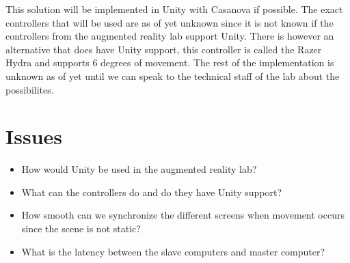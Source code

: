 \documentclass[10pt,a4paper]{article}
\begin{document}
This solution will be implemented in Unity with Casanova if possible. The exact controllers that will be used are as of yet unknown since it is not known if the controllers from the augmented reality lab support Unity. There is however an alternative that does have Unity support, this controller is called the Razer Hydra and supports 6 degrees of movement. The rest of the implementation is unknown as of yet until we can speak to the technical staff of the lab about the possibilites.

\section{Issues}
\begin{itemize}
\item How would Unity be used in the augmented reality lab?
\item What can the controllers do and do they have Unity support?
\item How smooth can we synchronize the different screens when movement occurs since the scene is not static?
\item What is the latency between the slave computers and master computer?
\end{itemize}
\end{document}
